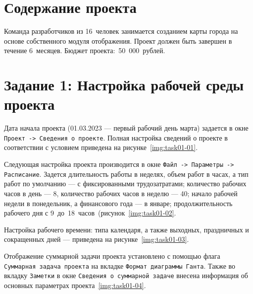 \chapter{Содержание проекта}

Команда разработчиков из 16~человек занимается созданием карты города на основе
собственного модуля отображения. Проект должен быть завершен в течение
6~месяцев. Бюджет проекта:~50~000~рублей.

\chapter{Задание 1: Настройка рабочей среды проекта}

Дата начала проекта (01.03.2023 --- первый рабочий день марта) задается в окне
\texttt{Проект -> Сведения о проекте}. Полная настройка сведений о проекте в
соответствии с условием приведена на рисунке~\ref{img:task01-01}.


Следующая настройка проекта производится в окне \texttt{Файл -> Параметры ->
Расписание}.  Задется длительность работы в неделях, объем работ в часах, а тип
работ по умолчанию --- с фиксированными трудозатратами; количество рабочих
часов в день --- 8, количество рабочих часов в неделю --- 40; начало рабочей
недели в понедельник, а финансового года --- в январе; продолжительность
рабочего дня с 9~до~18~часов~(рисунок~\ref{img:task01-02}.


Настройка рабочего времени: типа календаря, а также выходных, праздничных и
сокращенных дней --- приведена на рисунке~\ref{img:task01-03}.


Отображение суммарной задачи проекта установлено с помощью флага
\texttt{Суммарная задача проекта} на вкладке \texttt{Формат диаграммы Ганта}.
Также во вкладку \texttt{Заметки} в окне \texttt{Сведения о суммарной задаче}
внесена информация об основных параметрах проекта~\ref{img:task01-04}.

